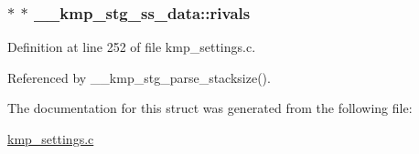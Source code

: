 \hypertarget{struct____kmp__stg__ss__data_a8e22789ecbb533e293ba7c5fac124c9e}{
\subsubsection[{rivals}]{$\ast$ $\ast$ \-\_\-\-\_\-kmp\-\_\-stg\-\_\-ss\-\_\-data\-::rivals}}\label{struct____kmp__stg__ss__data_a8e22789ecbb533e293ba7c5fac124c9e}


Definition at line 252 of file kmp\-\_\-settings.\-c.



Referenced by \-\_\-\-\_\-kmp\-\_\-stg\-\_\-parse\-\_\-stacksize().



The documentation for this struct was generated from the following file\-:\begin{DoxyCompactItemize}
\item 
\hyperlink{kmp__settings_8c}{kmp\-\_\-settings.\-c}\end{DoxyCompactItemize}
